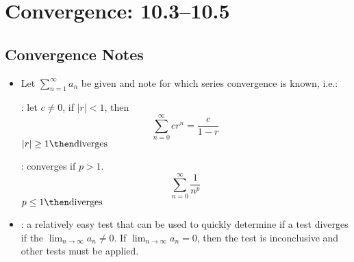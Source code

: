 \chapter{Convergence: 10.3--10.5}
\section{Convergence Notes}
\begin{itemize}

  \item Let \(\displaystyle \sum_{n=1}^{\infty} a_n\) be given and note for
    which series convergence is known, i.e.:

    \vspace{10pt}

    \begin{multicols}{2}
      : let \(c \neq 0\), if \(|r| < 1\), then
      \[%
        \sum_{n=0}^{\infty} cr^n = \frac{c}{1-r}
      \]%
      \(|r| \geq 1 \then \text{diverges}\)

      : converges if \(p > 1\).
      \[%
        \sum_{n=0}^{\infty} \frac{1}{n^p}
      \]%
      \(p \leq 1 \then \text{diverges}\)
    \end{multicols}

  \item {}: a relatively easy
    test that can be used to quickly determine if a test diverges if the
    \(\lim_{n \to \infty} a_n \neq 0 \). If \(\lim_{n \to \infty} a_n = 0\),
    then the test is inconclusive and other tests must be applied.

\end{itemize}


